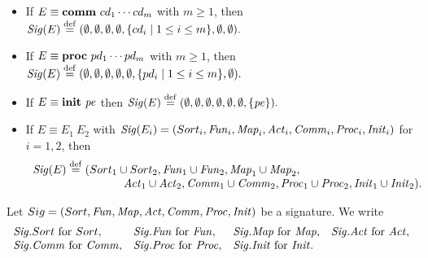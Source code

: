 \documentclass[fleqn,a4paper,dvips]{article}
\newcommand{\Sig}{\nm{Sig}}
\newcommand{\Fun}{\nm{Fun}}
\newcommand{\wor}{\stackrel{\mathrm{def}}{=}}
\begin{document}
{\begin{defn}
\begin{itemize}
If $E\equiv
\act~\ad_1\cdots \ad_m$ with $m\geq 1$,
then
$\Sig(E)\wor(\emptyset,\emptyset,\emptyset,\Act,
\emptyset,\emptyset,
\emptyset)$, where
\[\begin{array}{lll}
\Act&\wor&
\{n_{i}\mid ad_i\equiv
n_{i}, 1\leq i\leq m \}\\
&\cup&\{n_{ij}\ap S_{i1}\times\cdots\times S_{ik_i}\mid\\
&&~~~~~ad_i\equiv
n_{i1},\ldots,n_{il_i}\ap S_{i1}\times\cdots\times S_{ik_i}, 1\leq i\leq
m, 1\leq j\leq l_i\}.
\end{array}
\]
\item
If $E\equiv
\mathbf{comm}~cd_1\cdots cd_m$ with $m\geq 1$,
then
$\Sig(E)\wor(\emptyset,\emptyset,\emptyset,\emptyset,
\{cd_i\mid 1\leq
i\leq m\}, \emptyset,\emptyset).$
\item
If $E\equiv
\mathbf{proc}~pd_1\cdots pd_m$ with $m\geq 1$,
then
$\Sig(E)\wor(\emptyset,\emptyset,\emptyset,\emptyset,\emptyset,
\{pd_i\mid 1\leq i\leq m\},\emptyset).$
\item
If $E\equiv
\mathbf{init}~{\it pe}$ then $\Sig(E)\wor(\emptyset,\emptyset,\emptyset,\emptyset,\emptyset,
\emptyset,\{\pe\}).$
\item
If $E\equiv E_1~E_2$
with $\Sig(E_i)=(Sort_{i},\Fun_{i},\Map_i,
\Act_{i},\Comm_{i},\Proc_{i},\Init_i)$ for $i=1,2$, then
\[\begin{array}{l}
\Sig(E)\wor(Sort_{1}\cup Sort_{2},\Fun_{1}\cup \Fun_{2},
\Map_1\cup\Map_2,\\
\hspace{8em}\Act_{1}\cup \Act_{2},\Comm_{1}\cup \Comm_{2},\Proc_{1}\cup
\Proc_{2},
\Init_1\cup\Init_2).
\end{array}\]
\end{itemize}
\end{defn}
\begin{defn}
Let $Sig=(Sort,\Fun,\Map,\Act,\Comm,\Proc,\Init)$ be a signature. We write
\[\begin{array}{llll}
\Sig.Sort~\mbox{for}~Sort,&
\Sig.\Fun~\mbox{for}~\Fun,&
\Sig.\Map~{\rm for}~\Map,&
\Sig.\Act~\mbox{for}~\Act,\\
\Sig.\Comm~\mbox{for}~\Comm,&
\Sig.\Proc~\mbox{for}~\Proc,&
\Sig.\Init~\mbox{for}~\Init.
\end{array}\]
\end{defn}
}
\end{document}

